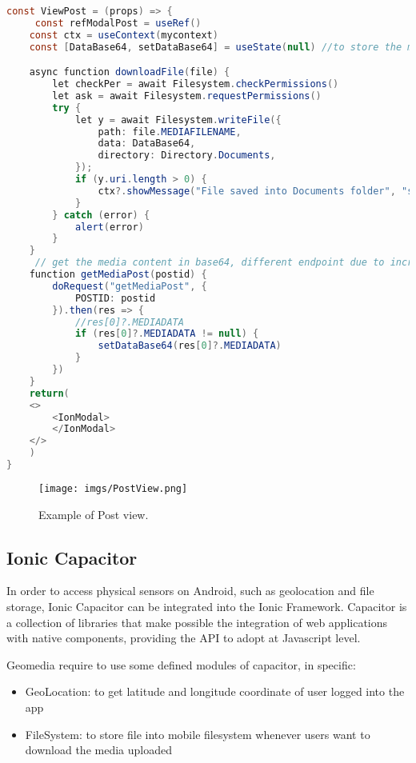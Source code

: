 \documentclass[conference]{IEEEtran}
\begin{document}
\begin{lstlisting}[language=Java, caption=ViewPost]
const ViewPost = (props) => {
     const refModalPost = useRef()
    const ctx = useContext(mycontext)
    const [DataBase64, setDataBase64] = useState(null) //to store the mediafile attached

    async function downloadFile(file) {
        let checkPer = await Filesystem.checkPermissions()
        let ask = await Filesystem.requestPermissions()
        try {
            let y = await Filesystem.writeFile({
                path: file.MEDIAFILENAME,
                data: DataBase64,
                directory: Directory.Documents,
            });
            if (y.uri.length > 0) {
                ctx?.showMessage("File saved into Documents folder", "success")
            }
        } catch (error) {
            alert(error)
        }
    }
     // get the media content in base64, different endpoint due to increment performance
    function getMediaPost(postid) {
        doRequest("getMediaPost", {
            POSTID: postid
        }).then(res => {
            //res[0]?.MEDIADATA
            if (res[0]?.MEDIADATA != null) {
                setDataBase64(res[0]?.MEDIADATA)
            }
        })
    }
    return(
    <>
        <IonModal>
        </IonModal>
    </>
    )
}
\end{lstlisting}


\begin{figure}[htbp]
\begin{center}
{\texttt{[image: imgs/PostView.png]}}
\end{center}
\caption{Example of Post view.}
\label{fig}
\end{figure}


\subsection{Ionic Capacitor}

In order to access physical sensors on Android, such as geolocation and file storage, Ionic Capacitor can be integrated into the Ionic Framework. Capacitor is a collection of libraries that make possible the integration of web applications with native components, providing the API to adopt at Javascript level.

Geomedia require to use some defined modules of capacitor, in specific:
\begin{itemize}
    \item GeoLocation\cite{b2}: to get latitude and longitude coordinate of user logged into the app
    \item FileSystem\cite{b3}: to store file into mobile filesystem whenever users want to download the media uploaded
\end{itemize}
\end{document}
